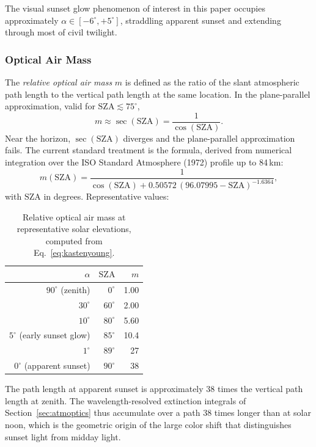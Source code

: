 \documentclass[11pt,a4paper]{article}
\newcommand{\SZA}{\text{SZA}}
\begin{document}
The visual sunset glow phenomenon of interest in this paper occupies approximately $\alpha \in [-6^\circ, +5^\circ]$, straddling apparent sunset and extending through most of civil twilight.

\subsubsection{Optical Air Mass}

The \emph{relative optical air mass} $m$ is defined as the ratio of the slant atmospheric path length to the vertical path length at the same location. In the plane-parallel approximation, valid for $\SZA \lesssim 75^\circ$,
\begin{equation}
m \approx \sec(\SZA) = \frac{1}{\cos(\SZA)}.
\end{equation}
Near the horizon, $\sec(\SZA)$ diverges and the plane-parallel approximation fails. The current standard treatment is the \citet{kasten1989airmass} formula, derived from numerical integration over the ISO Standard Atmosphere (1972) profile up to 84\,km:
\begin{equation}
m(\SZA) = \frac{1}{\cos(\SZA) + 0.50572 \,(96.07995 - \SZA)^{-1.6364}},
\label{eq:kastenyoung}
\end{equation}
with $\SZA$ in degrees. Representative values:

\begin{table}[H]
\centering
\small
\begin{tabular}{rrr}
\toprule
$\alpha$ & $\SZA$ & $m$ \\
\midrule
$90^\circ$ (zenith) & $0^\circ$ & 1.00 \\
$30^\circ$ & $60^\circ$ & 2.00 \\
$10^\circ$ & $80^\circ$ & 5.60 \\
$5^\circ$ (early sunset glow) & $85^\circ$ & 10.4 \\
$1^\circ$ & $89^\circ$ & 27 \\
$0^\circ$ (apparent sunset) & $90^\circ$ & 38 \\
\bottomrule
\end{tabular}
\caption{Relative optical air mass at representative solar elevations, computed from Eq.~\ref{eq:kastenyoung}.}
\label{tab:airmass}
\end{table}

The path length at apparent sunset is approximately 38 times the vertical path length at zenith. The wavelength-resolved extinction integrals of Section~\ref{sec:atmoptics} thus accumulate over a path 38 times longer than at solar noon, which is the geometric origin of the large color shift that distinguishes sunset light from midday light.
\end{document}
